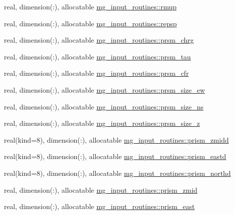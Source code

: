 \begin{DoxyCompactItemize}
\item 
real, dimension(\+:), allocatable \hyperlink{namespacemg__input__routines_afbce09624f454be0b02b077f690ad964}{mg\+\_\+input\+\_\+routines\+::rmup}
\item 
real, dimension(\+:), allocatable \hyperlink{namespacemg__input__routines_adcd8638c001ab38fd059d439f81680e8}{mg\+\_\+input\+\_\+routines\+::repsp}
\item 
real, dimension(\+:), allocatable \hyperlink{namespacemg__input__routines_ac4b823779f4f1d9c4c865c6c10fa6ac3}{mg\+\_\+input\+\_\+routines\+::prsm\+\_\+chrg}
\item 
real, dimension(\+:), allocatable \hyperlink{namespacemg__input__routines_a9705d034bcbc95f9aa4c692fa6179e28}{mg\+\_\+input\+\_\+routines\+::prsm\+\_\+tau}
\item 
real, dimension(\+:), allocatable \hyperlink{namespacemg__input__routines_adea12aabc0029be1c31e4df42901ca59}{mg\+\_\+input\+\_\+routines\+::prsm\+\_\+cfr}
\item 
real, dimension(\+:), allocatable \hyperlink{namespacemg__input__routines_a6f5b140f82f592045dc986e2dc03f53f}{mg\+\_\+input\+\_\+routines\+::prsm\+\_\+size\+\_\+ew}
\item 
real, dimension(\+:), allocatable \hyperlink{namespacemg__input__routines_a3e3b754cd4bc045bf19d4e4e03d012db}{mg\+\_\+input\+\_\+routines\+::prsm\+\_\+size\+\_\+ns}
\item 
real, dimension(\+:), allocatable \hyperlink{namespacemg__input__routines_ade50e1020813ba08c9ed7d460dd19c75}{mg\+\_\+input\+\_\+routines\+::prsm\+\_\+size\+\_\+z}
\item 
real(kind=8), dimension(\+:), allocatable \hyperlink{namespacemg__input__routines_ae1f2713de2bcca2185162ab5375f6b6e}{mg\+\_\+input\+\_\+routines\+::prism\+\_\+zmidd}
\item 
real(kind=8), dimension(\+:), allocatable \hyperlink{namespacemg__input__routines_a53fc28fb731802a24bd6d16a5e7e00b6}{mg\+\_\+input\+\_\+routines\+::prism\+\_\+eastd}
\item 
real(kind=8), dimension(\+:), allocatable \hyperlink{namespacemg__input__routines_a19683e50dac001a949205f52ccd0cb23}{mg\+\_\+input\+\_\+routines\+::prism\+\_\+northd}
\item 
real, dimension(\+:), allocatable \hyperlink{namespacemg__input__routines_aa765051314dcfacd6dc6e2c1ea17ed04}{mg\+\_\+input\+\_\+routines\+::prism\+\_\+zmid}
\item 
real, dimension(\+:), allocatable \hyperlink{namespacemg__input__routines_a3b79964f71670b4e30aa6d0879c4fd28}{mg\+\_\+input\+\_\+routines\+::prism\+\_\+east}

\end{DoxyCompactItemize}

